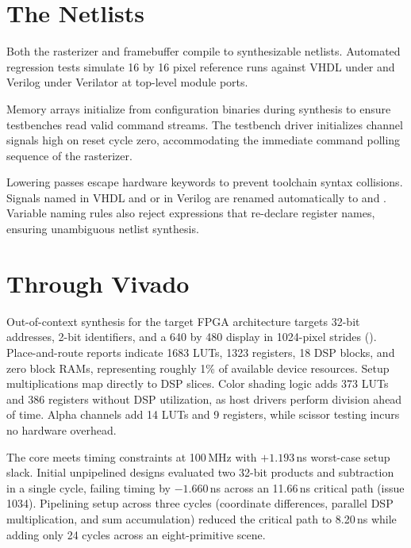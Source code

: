 \documentclass[journal,9pt]{IEEEtran}
\begin{document}
\section{The Netlists}
\label{sec:g-netlist}

Both the rasterizer and framebuffer compile to synthesizable netlists.
Automated regression tests simulate 16 by 16 pixel reference runs against
VHDL under  and Verilog under Verilator at top-level module ports.

Memory arrays initialize from configuration binaries during synthesis to
ensure testbenches read valid command streams. The testbench driver
initializes channel  signals high on reset cycle zero,
accommodating the immediate command polling sequence of the rasterizer.



Lowering passes escape hardware keywords to prevent toolchain syntax
collisions. Signals named  in VHDL and  or 
in Verilog are renamed automatically to  and .
Variable naming rules also reject expressions that re-declare register names,
ensuring unambiguous netlist synthesis.

\section{Through Vivado}
\label{sec:g-vivado}

Out-of-context synthesis for the target FPGA architecture targets 32-bit
addresses, 2-bit identifiers, and a 640 by 480 display in 1024-pixel strides
(). Place-and-route reports indicate 1683
LUTs, 1323 registers, 18 DSP blocks, and zero block RAMs, representing
roughly 1\% of available device resources. Setup multiplications map
directly to DSP slices. Color shading logic adds 373 LUTs and 386 registers
without DSP utilization, as host drivers perform division ahead of time.
Alpha channels add 14 LUTs and 9 registers, while scissor testing incurs no
hardware overhead.

The core meets timing constraints at 100\,MHz with $+1.193$\,ns worst-case
setup slack. Initial unpipelined designs evaluated two 32-bit products and
subtraction in a single cycle, failing timing by $-1.660$\,ns across an
11.66\,ns critical path (issue 1034). Pipelining setup across three
cycles (coordinate differences, parallel DSP multiplication, and sum
accumulation) reduced the critical path to 8.20\,ns while adding only 24
cycles across an eight-primitive scene.
\end{document}
